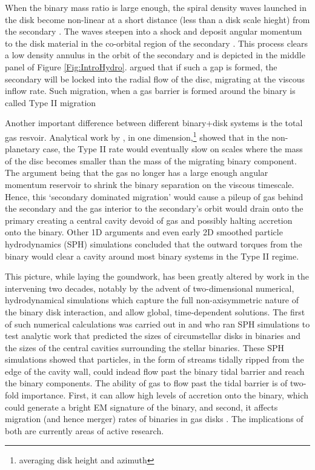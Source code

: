 When the binary mass ratio is large enough, the spiral density waves launched
in the disk become non-linear at a short distance (less than a disk scale
hieght) from the secondary \citep{GoodmanRafikov:2001}. The waves steepen into
a shock and deposit angular momentum to the disk material in the co-orbital
region of the secondary \citep[see Chapter \ref{ch:CBDTrans} and also][]{DongRafI:2011, DongRafII:2011, LinPapaI:1984,LinPapa86b,
LinPapaIII:1986}. This process clears a low density annulus in the orbit of
the secondary and is depicted in the middle panel of Figure
\ref{Fig:IntroHydro}. \cite{LinPapa86b} argued that if
such a gap is formed, the secondary will be locked into the radial flow of the
disc, migrating at the viscous inflow rate. Such migration, when a gas barrier
is formed around the binary is called Type II migration \citep[see also][and Chapter \ref{ch:CBDTrans}]{Ward:1997, KleyNelson:2012:rev}



Another important difference between different binary+disk systems is the
total gas resvoir. Analytical work by \citep{SyerClarke95, Ivanov99}, in
one dimension,\footnote{averaging disk height and azimuth} showed that in the
non-planetary case, the Type II rate would eventually slow on scales where the
mass of the disc becomes smaller than the mass of the migrating binary
component. The argument being that the gas no longer has a large enough angular
momentum reservoir to shrink the binary separation on the viscous
timescale. Hence, this `secondary dominated migration' would cause a pileup of
gas behind the secondary and the gas interior to the secondary's orbit would
drain onto the primary creating a central cavity devoid of gas and possibly
halting accretion onto the binary. Other 1D arguments
\citep[][]{Milos:Phinney:2005} and even early 2D smoothed particle hydrodynamics
(SPH) simulations \citep{Artymowicz:1991} concluded that the outward torques
from the binary would clear a cavity around most binary systems in the Type II
regime.


This picture, while laying the goundwork, has been greatly altered by work in
the intervening two decades, notably by the advent of two-dimensional
numerical, hydrodynamical simulations which capture the full non-axisymmetric
nature of the binary disk interaction, and allow global, time-dependent
solutions. The first of such numerical calculations was carried out in
\cite{AL94} and \cite{ArtyLubow:1996} who ran SPH simulations to
test analytic work that predicted the sizes of circumstellar disks in binaries
and the sizes of the central cavities surrounding the stellar binaries. These
SPH simulations showed that particles, in the form of streams tidally ripped
from the edge of the cavity wall, could indead flow past the binary tidal
barrier and reach the binary components. The ability of gas to flow past the
tidal barrier is of two-fold importance. First, it can allow high levels of
accretion onto the binary, which could generate a bright EM signature of the
binary, and second, it affects migration (and hence merger) rates of binaries
in gas disks \citep{DuffellFTV:2014}. The implications of both are currently areas
of active research. 




